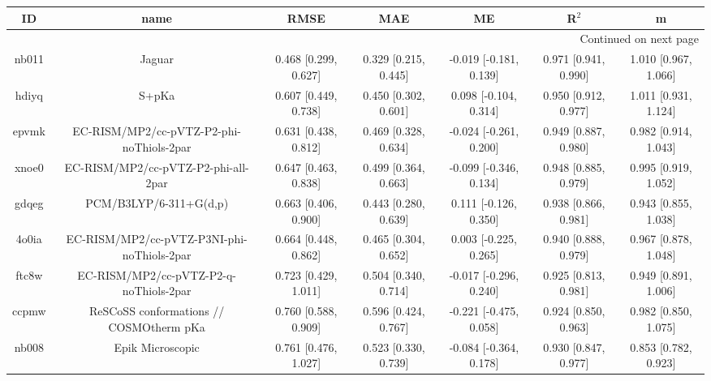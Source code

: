 \documentclass{article}
\begin{document}
\begin{center}
\begin{longtable}{|ccccccc|}
\toprule
    ID &                                               name &                  RMSE &                   MAE &                       ME &                 R$^2$ &                      m \\
\midrule
\endhead
\midrule
\multicolumn{7}{r}{{Continued on next page}} \\
\midrule
\endfoot

\bottomrule
\endlastfoot
 nb011 &                                             Jaguar &  0.468 [0.299, 0.627] &  0.329 [0.215, 0.445] &   -0.019 [-0.181, 0.139] &  0.971 [0.941, 0.990] &   1.010 [0.967, 1.066] \\
 hdiyq &                                              S+pKa &  0.607 [0.449, 0.738] &  0.450 [0.302, 0.601] &    0.098 [-0.104, 0.314] &  0.950 [0.912, 0.977] &   1.011 [0.931, 1.124] \\
 epvmk &           EC-RISM/MP2/cc-pVTZ-P2-phi-noThiols-2par &  0.631 [0.438, 0.812] &  0.469 [0.328, 0.634] &   -0.024 [-0.261, 0.200] &  0.949 [0.887, 0.980] &   0.982 [0.914, 1.043] \\
 xnoe0 &                EC-RISM/MP2/cc-pVTZ-P2-phi-all-2par &  0.647 [0.463, 0.838] &  0.499 [0.364, 0.663] &   -0.099 [-0.346, 0.134] &  0.948 [0.885, 0.979] &   0.995 [0.919, 1.052] \\
 gdqeg &                             PCM/B3LYP/6-311+G(d,p) &  0.663 [0.406, 0.900] &  0.443 [0.280, 0.639] &    0.111 [-0.126, 0.350] &  0.938 [0.866, 0.981] &   0.943 [0.855, 1.038] \\
 4o0ia &         EC-RISM/MP2/cc-pVTZ-P3NI-phi-noThiols-2par &  0.664 [0.448, 0.862] &  0.465 [0.304, 0.652] &    0.003 [-0.225, 0.265] &  0.940 [0.888, 0.979] &   0.967 [0.878, 1.048] \\
 ftc8w &             EC-RISM/MP2/cc-pVTZ-P2-q-noThiols-2par &  0.723 [0.429, 1.011] &  0.504 [0.340, 0.714] &   -0.017 [-0.296, 0.240] &  0.925 [0.813, 0.981] &   0.949 [0.891, 1.006] \\
 ccpmw &            ReSCoSS conformations // COSMOtherm pKa &  0.760 [0.588, 0.909] &  0.596 [0.424, 0.767] &   -0.221 [-0.475, 0.058] &  0.924 [0.850, 0.963] &   0.982 [0.850, 1.075] \\
 nb008 &                                   Epik Microscopic &  0.761 [0.476, 1.027] &  0.523 [0.330, 0.739] &   -0.084 [-0.364, 0.178] &  0.930 [0.847, 0.977] &   0.853 [0.782, 0.923] \\

\end{longtable}
\end{center}
\end{document}
